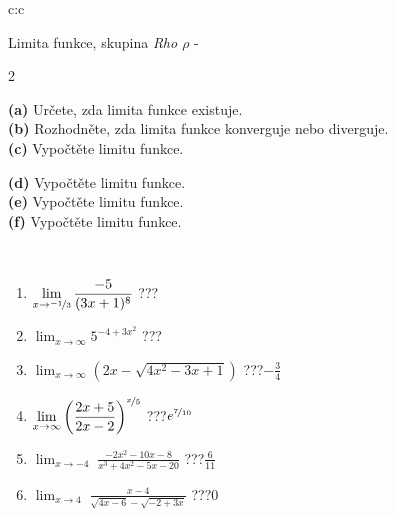 \documentclass[10pt]{report}
\begin{document}
\thispagestyle{empty}
\begin{tabular}{c:c}
\begin{minipage}[c][104.5mm][t]{0.5\linewidth}
\begin{center}
\vspace{7mm}
{\huge Limita funkce, skupina \textit{Rho $\rho$} -}\\[5mm]
\begin{minipage}{0.95\linewidth}
\begin{center}
{\small \begin{multicols}{2} \raggedright
\textbf{(a)} Určete, zda limita funkce existuje. \\[1mm]
\textbf{(b)} Rozhodněte, zda limita funkce konverguje nebo diverguje. \\[1mm]
\textbf{(c)} Vypočtěte limitu funkce. \par \columnbreak
\textbf{(d)} Vypočtěte limitu funkce. \\[1mm]
\textbf{(e)} Vypočtěte limitu funkce. \\[1mm]
\textbf{(f)} Vypočtěte limitu funkce. \\[1mm]
\end{multicols}
}
\end{center}
\end{minipage}
\\[4mm]
\begin{minipage}{0.79\linewidth}
\begin{center}
\begin{varwidth}{\linewidth}
\begin{enumerate}
\normalsize
\item $\displaystyle\lim_{x\to\nicefrac{-1}{3}}{\frac{-5}{(3x+1)^{8}}}$\quad \dotfill\; ???\;\dotfill \quad {}
\item $\displaystyle\lim_{x\to\infty}{5^{-4+3x^2}}$\quad \dotfill\; ???\;\dotfill \quad {}
\item $\displaystyle\lim_{x\to\infty}{\left(2x - \sqrt{4x^2-3x+1}\right)}$\quad \dotfill\; ???\;\dotfill \quad $-\frac{3}{4}$
\item $\displaystyle\lim_{x\to\infty}{\left( \frac{2x+5}{2x-2} \right)^{\nicefrac{x}{5}}}$\quad \dotfill\; ???\;\dotfill \quad $e^{\nicefrac{7}{10}}$
\item $\displaystyle\lim_{x\to -4}{\;\frac{-2x^2-10x-8}{x^3+4x^2-5x-20}}$\quad \dotfill\; ???\;\dotfill \quad $\frac{6}{11}$
\item $\displaystyle\lim_{x\to 4}{\;\frac{x-4}{\sqrt{4x-6} - \sqrt{-2+3x}}}$\quad \dotfill\; ???\;\dotfill \quad $0$

\end{enumerate}
\end{varwidth}
\end{center}
\end{minipage}
\end{center}
\end{minipage}
\end{tabular}
\end{document}
